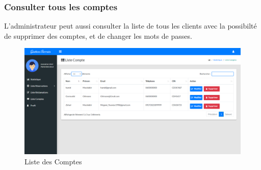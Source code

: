 \documentclass[a4paper]{report}
\begin{document}
\begin{spacing}{2}
\subsubsection{Consulter tous les comptes}
L'administrateur peut aussi consulter la liste de tous les clients avec la possibilté de supprimer des comptes, et de changer les mots de passes.
\begin{figure}[!ht]
\begin{center}
\includegraphics[width=18cm]{Screenshots/ToutLesComptes.png}
\end{center}
\caption[Liste des comptes]{Liste des Comptes}
\end{figure}


\end{spacing}
\end{document}
